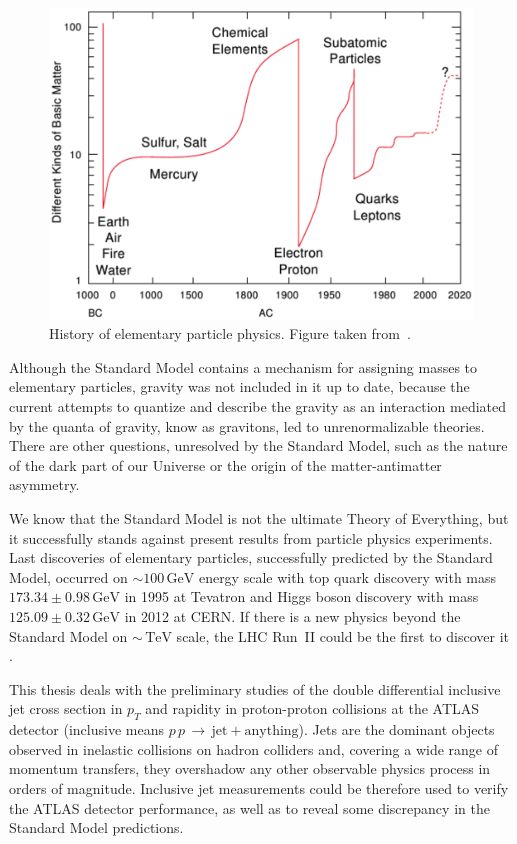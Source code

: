 \documentclass[a4paper,11pt,twoside,openright]{book}
\newcommand{\TeV}{\,\text{TeV}}
\newcommand{\GeV}{\,\text{GeV}}
\newcommand{\pt}{p_{T}}
\begin{document}
\begin{figure}[t]
  \centering
  \includegraphics[width=\textwidth]{Introduction/HistoryOfElementaryParticlePhysics.png}
  \caption[History of elementary particle physics.]{History of elementary
    particle physics. Figure taken from~\cite{LatticeQCDForPedestrians}.}
  \label{fig:HistoryOfElPartPhysics}
\end{figure}

Although the Standard Model contains a mechanism for assigning masses to
elementary particles, gravity was not included in it up
to date, because the current attempts to quantize and describe the gravity as an
interaction mediated by the quanta of gravity, know as gravitons, led to
unrenormalizable theories. There are other questions, unresolved by the Standard
Model, such as the nature of the dark part of our Universe or the origin of the
matter-antimatter asymmetry.

We know that the Standard Model is not the ultimate Theory of Everything,
but it successfully stands against present results from particle physics
experiments. 
Last discoveries of elementary particles, successfully predicted by the Standard
Model, occurred on $\sim 100\GeV$ energy scale with top quark discovery
\cite{TopQuark1,TopQuark2} with mass $173.34 \pm 0.98 \GeV$ in 1995 at Tevatron
and Higgs boson discovery \cite{HiggsDiscovery} with mass $125.09 \pm 0.32 \GeV$
in 2012 at CERN.
If there is a new physics beyond the Standard Model on $\sim \TeV$ scale, the
LHC Run~II could be the first to discover it \cite{PhysicsAtRun2LHC}. 

This thesis deals with the preliminary studies of the double differential inclusive jet 
cross section in $\pt$ and rapidity in proton-proton collisions at the ATLAS
detector (inclusive means
$p\,p\,\rightarrow\,\text{jet}+\text{anything}$). 
Jets are the dominant objects observed in inelastic collisions on hadron
colliders and, covering a wide range of momentum transfers, they overshadow any
other observable physics process in orders of magnitude.
Inclusive jet measurements could be therefore used to verify the ATLAS detector performance,
as well as to reveal some discrepancy in the Standard Model predictions.
\end{document}

